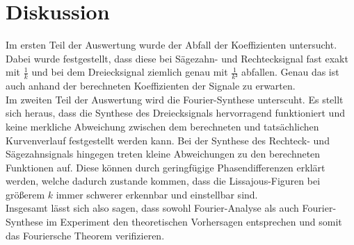 \section{Diskussion}
\label{sec:Diskussion}

Im ersten Teil der Auswertung wurde der Abfall der Koeffizienten untersucht. 
Dabei wurde festgestellt, dass diese bei Sägezahn- und Rechtecksignal fast 
exakt mit $\frac{1}{k}$ und bei dem Dreiecksignal ziemlich genau mit $\frac{1}{k²}$
abfallen. Genau das ist auch anhand der berechneten Koeffizienten der Signale 
zu erwarten. 
\\
Im zweiten Teil der Auswertung wird die Fourier-Synthese unterscuht. Es stellt 
sich heraus, dass die Synthese des Dreiecksignals hervorragend funktioniert und 
keine merkliche Abweichung zwischen dem berechneten und tatsächlichen Kurvenverlauf
festgestellt werden kann. Bei der Synthese des Rechteck- und Sägezahnsignals 
hingegen treten kleine Abweichungen zu den berechneten Funktionen auf. Diese 
können durch geringfügige Phasendifferenzen erklärt werden, welche dadurch zustande
kommen, dass die Lissajous-Figuren bei größerem $k$ immer schwerer erkennbar und 
einstellbar sind. 
\\
Insgesamt lässt sich also sagen, dass sowohl Fourier-Analyse als auch Fourier-Synthese
im Experiment den theoretischen Vorhersagen entsprechen und somit das 
Fouriersche Theorem verifizieren. 